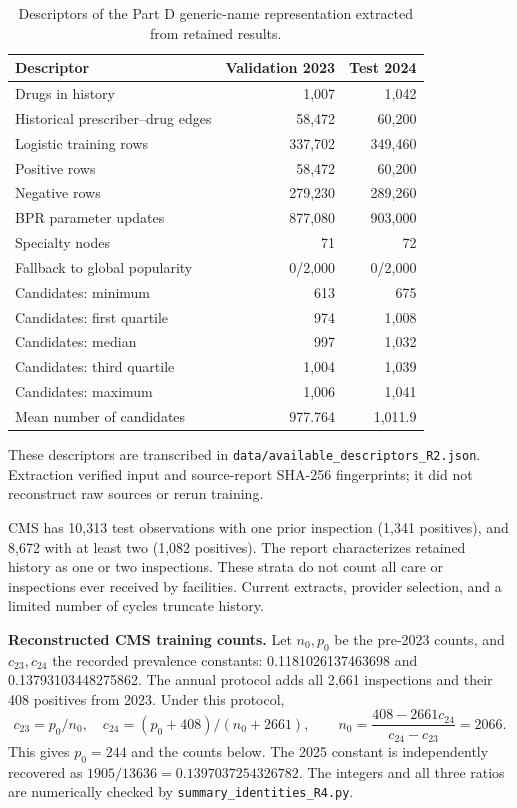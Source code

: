\documentclass[10pt,a4paper]{article}
\newcommand{\src}[1]{{\small\nolinkurl{#1}}}
\begin{document}
\begin{table}[!htbp]\centering\small
\caption{Descriptors of the Part D generic-name representation extracted from retained results.}
\begin{tabularx}{\linewidth}{@{}Xrr@{}}
\toprule
Descriptor & Validation 2023 & Test 2024\\
\midrule
Drugs in history & 1,007 & 1,042\\
Historical prescriber--drug edges & 58,472 & 60,200\\
Logistic training rows & 337,702 & 349,460\\
Positive rows & 58,472 & 60,200\\
Negative rows & 279,230 & 289,260\\
BPR parameter updates & 877,080 & 903,000\\
Specialty nodes & 71 & 72\\
Fallback to global popularity & 0/2,000 & 0/2,000\\
Candidates: minimum & 613 & 675\\
Candidates: first quartile & 974 & 1,008\\
Candidates: median & 997 & 1,032\\
Candidates: third quartile & 1,004 & 1,039\\
Candidates: maximum & 1,006 & 1,041\\
Mean number of candidates & 977.764 & 1,011.9\\
\bottomrule
\end{tabularx}
\end{table}

These descriptors are transcribed in \src{data/available_descriptors_R2.json}. Extraction verified input and source-report SHA-256 fingerprints; it did not reconstruct raw sources or rerun training.

CMS has 10,313 test observations with one prior inspection (1,341 positives), and 8,672 with at least two (1,082 positives). The report characterizes retained history as one or two inspections. These strata do not count all care or inspections ever received by facilities. Current extracts, provider selection, and a limited number of cycles truncate history\cite{hgbanalysis,hgbresults}.

\textbf{Reconstructed CMS training counts.} Let $n_0,p_0$ be the pre-2023 counts, and $c_{23},c_{24}$ the recorded prevalence constants: 0.1181026137463698 and 0.13793103448275862. The annual protocol adds all 2,661 inspections and their 408 positives from 2023\cite{hgbcode}. Under this protocol,
\[
 c_{23}=p_0/n_0,\quad c_{24}=(p_0+408)/(n_0+2661),\qquad
 n_0=\frac{408-2661c_{24}}{c_{24}-c_{23}}=2066.
\]
This gives $p_0=244$ and the counts below. The 2025 constant is independently recovered as $1905/13636=0.1397037254326782$. The integers and all three ratios are numerically checked by \src{summary_identities_R4.py}.
\begin{table}[!htbp]\centering\small
\caption{CMS counts reconstructed algebraically under the stated protocol, not read directly from training rows.}

\end{table}
\end{document}
